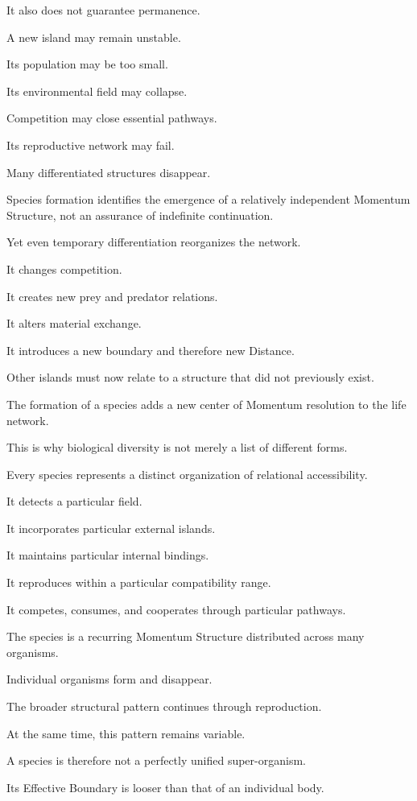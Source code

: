 It also does not guarantee permanence.

A new island may remain unstable.

Its population may be too small.

Its environmental field may collapse.

Competition may close essential pathways.

Its reproductive network may fail.

Many differentiated structures disappear.

Species formation identifies the emergence of a relatively independent Momentum Structure, not an assurance of indefinite continuation.

Yet even temporary differentiation reorganizes the network.

It changes competition.

It creates new prey and predator relations.

It alters material exchange.

It introduces a new boundary and therefore new Distance.

Other islands must now relate to a structure that did not previously exist.

The formation of a species adds a new center of Momentum resolution to the life network.

This is why biological diversity is not merely a list of different forms.

Every species represents a distinct organization of relational accessibility.

It detects a particular field.

It incorporates particular external islands.

It maintains particular internal bindings.

It reproduces within a particular compatibility range.

It competes, consumes, and cooperates through particular pathways.

The species is a recurring Momentum Structure distributed across many organisms.

Individual organisms form and disappear.

The broader structural pattern continues through reproduction.

At the same time, this pattern remains variable.

A species is therefore not a perfectly unified super-organism.

Its Effective Boundary is looser than that of an individual body.

